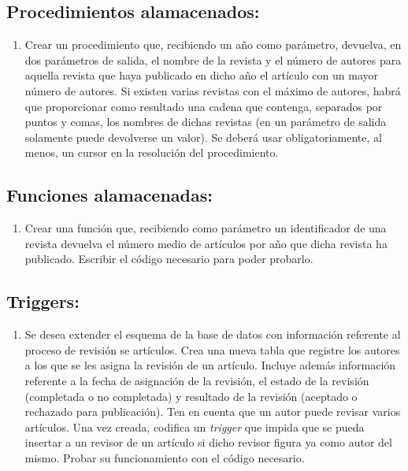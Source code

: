 \documentclass{db-practice}
\begin{document}
\subsection*{Procedimientos alamacenados:}

\begin{enumerate}
    \item Crear un procedimiento que, recibiendo un año como parámetro, devuelva, en dos parámetros de salida, el nombre de la revista y el número de autores para aquella revista que haya publicado en dicho año el artículo con un mayor número de autores. Si existen varias revistas con el máximo de autores, habrá que proporcionar como resultado una cadena que contenga, separados por puntos y comas, los nombres de dichas revistas (en un parámetro de salida solamente puede devolverse un valor). Se deberá usar obligatoriamente, al menos, un cursor en la resolución del procedimiento.
\end{enumerate}

\subsection*{Funciones alamacenadas:}

\begin{enumerate}
    \item Crear una función que, recibiendo como parámetro un identificador de una revista devuelva el número medio de artículos por año que dicha revista ha publicado. Escribir el código necesario para poder probarlo.
\end{enumerate}

\subsection*{Triggers:}

\begin{enumerate}
    \item Se desea extender el esquema de la base de datos con información referente al proceso de revisión se artículos. Crea una nueva tabla que registre los autores a los que se les asigna la revisión de un artículo. Incluye además información referente a la fecha de asignación de la revisión, el estado de la revisión (completada o no completada) y resultado de la revisión (aceptado o rechazado para publicación). Ten en cuenta que un autor puede revisar varios artículos. Una vez creada, codifica un \textit{trigger} que impida que se pueda insertar a un revisor de un artículo si dicho revisor figura ya como autor del mismo. Probar su funcionamiento con el código necesario.
\end{enumerate}
\end{document}
